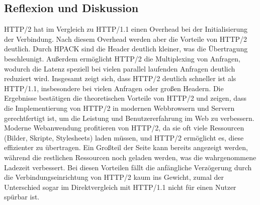 \subsection{Reflexion und Diskussion}

HTTP/2 hat im Vergleich zu HTTP/1.1 einen Overhead bei der Initialisierung der Verbindung.
Nach diesem Overhead werden aber die Vorteile von HTTP/2 deutlich.
Durch HPACK sind die Header deutlich kleiner, was die Übertragung beschleunigt.
Außerdem ermöglicht HTTP/2 die Multiplexing von Anfragen, wodurch die Latenz speziell bei vielen parallel laufenden Anfragen deutlich reduziert wird.
Insgesamt zeigt sich, dass HTTP/2 deutlich schneller ist als HTTP/1.1, insbesondere bei vielen Anfragen oder großen Headern.
Die Ergebnisse bestätigen die theoretischen Vorteile von HTTP/2 und zeigen, dass die Implementierung von HTTP/2 in modernen Webbrowsern und Servern gerechtfertigt ist, um die Leistung und Benutzererfahrung im Web zu verbessern.
Moderne Webanwendung profitieren von HTTP/2, da sie oft viele Ressourcen (Bilder, Skripte, Stylesheets) laden müssen, und HTTP/2 ermöglicht es, diese effizienter zu übertragen.
Ein Großteil der Seite kann bereits angezeigt werden, während die restlichen Ressourcen noch geladen werden, was die wahrgenommene Ladezeit verbessert.
Bei diesen Vorteilen fällt die anfängliche Verzögerung durch die Verbindungseinrichtung von HTTP/2 kaum ins Gewicht, zumal der Unterschied sogar im Direktvergleich mit HTTP/1.1 nicht für einen Nutzer spürbar ist.